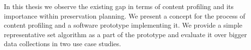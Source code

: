 In this thesis we observe the existing gap in terms of content profiling and its importance within preservation
planning. 
We present a concept for the process of content profiling and a software prototype implementing it.
 We provide a simple representative set algorithm as a part of the prototype and evaluate it over bigger data collections in two use case studies.